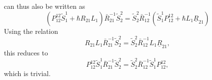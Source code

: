 \documentclass[11pt]{report}
\theoremstyle{definition}
\theoremstyle{remark}
\theoremstyle{remark}
\begin{document}
can thus also be written as
\begin{equation*}
(P_{12}^{12} \tilde S_1^1 + \hbar R_{21} L_1) \bar R_{21}^{-1} \tilde S_2^2 = \tilde S_2^2 \bar R_{12}^{-1} (\tilde S_1^1 P_{12}^{12} + \hbar L_1 \underline{R}_{21})
\end{equation*}
Using the relation
\begin{equation*}
R_{21} L_1 \bar R_{21}^{-1} \tilde S_2^2
= \tilde S_2^2 \bar R_{12}^{-1} L_1 \underline{R}_{21},
\end{equation*}
this reduces to
\begin{equation*}
P_{12}^{12} \tilde S_1^1 \bar R_{21}^{-1} \tilde S_2^2 = \tilde S_2^2 \bar R_{12}^{-1} \tilde S_1^1 P_{12}^{12},
\end{equation*}
which is trivial.

\pagebreak
\end{document}
